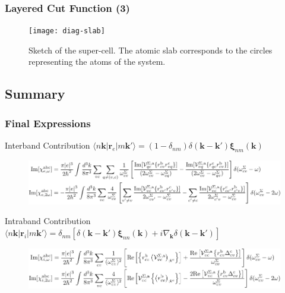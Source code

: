 \documentclass{beamer}
\begin{document}
\begin{frame}
\frametitle{Layered Cut Function (3)}
\begin{figure}
\centering
\texttt{[image: diag-slab]}
\caption{Sketch of the super-cell. The atomic slab corresponds to the circles
representing the atoms of the system.}
\end{figure}
\end{frame}


\subsection{Summary}

\begin{frame}
\frametitle{Final Expressions}
\begin{block}{Interband Contribution {\tiny $\langle n\mathbf{k}| \mathbf{r}_{e} |m\mathbf{k}'\rangle = (1- \delta_{nm})\delta(\mathbf{k}-\mathbf{k}')\boldsymbol{\xi}_{nm}(\mathbf{k})$}}
\begin{figure}
\centering
\includegraphics[scale=0.70]{chis_inter}
\end{figure}
\end{block}
\begin{alertblock}{Intraband Contribution {\tiny $\langle n\mathbf{k}\vert \mathbf{r}_{i} |m\mathbf{k}'\rangle = \delta_{nm}\left[\delta(\mathbf{k} - \mathbf{k}')\boldsymbol{\xi}_{nn}(\mathbf{k}) + i\nabla_{\mathbf{k}}\delta(\mathbf{k} - \mathbf{k}')\right]$}}
\begin{figure}
\centering
\includegraphics[scale=0.70]{chis_intra}
\end{figure}
\end{alertblock}
\end{frame}
\end{document}
